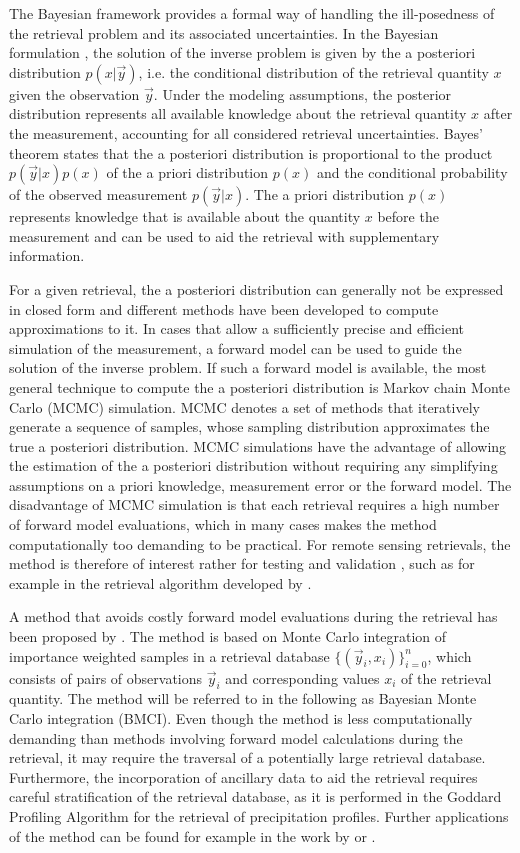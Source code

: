 \documentclass[journal abbreviation, manuscript]{copernicus}
\begin{document}
The Bayesian framework provides a formal way of handling the ill-posedness of
the retrieval problem and its associated uncertainties. In the Bayesian
formulation \citep{rodgers}, the solution of the inverse problem is given by the
a posteriori distribution $p(x | \vec{y})$, i.e. the conditional distribution of
the retrieval quantity $x$ given the observation $\vec{y}$. Under the modeling
assumptions, the posterior distribution represents all available knowledge about
the retrieval quantity $x$ after the measurement, accounting for all considered
retrieval uncertainties. Bayes' theorem states that the a posteriori
distribution is proportional to the product $p(\vec{y} | x)p(x)$ of the a priori
distribution $p(x)$ and the conditional probability of the observed measurement
$p(\vec{y} | x)$. The a priori distribution $p(x)$ represents knowledge that is
available about the quantity $x$ before the measurement and can be used to aid
the retrieval with supplementary information.

For a given retrieval, the a posteriori distribution can generally not be
expressed in closed form and different methods have been developed to compute
approximations to it. In cases that allow a sufficiently precise and efficient
simulation of the measurement, a forward model can be used to guide the solution
of the inverse problem. If such a forward model is available, the most general
technique to compute the a posteriori distribution is Markov chain Monte Carlo
(MCMC) simulation. MCMC denotes a set of methods that iteratively generate a
sequence of samples, whose sampling distribution approximates the true a
posteriori distribution. MCMC simulations have the advantage of allowing the
estimation of the a posteriori distribution without requiring any simplifying
assumptions on a priori knowledge, measurement error or the forward model.  The
 disadvantage of MCMC simulation is that each retrieval requires a
high number of forward model evaluations, which in many cases makes the method
computationally too demanding to be practical. For remote sensing retrievals, the
method is therefore of interest rather for testing and validation \citep{tamminen}, such
as for example in the retrieval algorithm developed by \cite{evans_2}.

A method that avoids costly forward model evaluations during the retrieval has
been proposed by \cite{kummerow_1}. The method is based on Monte Carlo
integration of importance weighted samples in a retrieval database
$\{(\vec{y}_i, x_i)\}_{i = 0}^n$, which consists of pairs of observations
$\vec{y}_i$ and corresponding values $x_i$ of the retrieval quantity. The
method will be referred to in the following as Bayesian Monte Carlo integration
(BMCI). Even though the method is less computationally demanding than methods
involving forward model calculations during the retrieval, it may require the
traversal of a potentially large retrieval database. Furthermore, the
incorporation of ancillary data to aid the retrieval requires careful
stratification of the retrieval database, as it is performed in the Goddard
Profiling Algorithm \citep{gprof} for the retrieval of precipitation profiles. 
Further applications of the method can be found for example in the work by
\cite{rydberg_2} or \cite{evans_2}.
\end{document}
